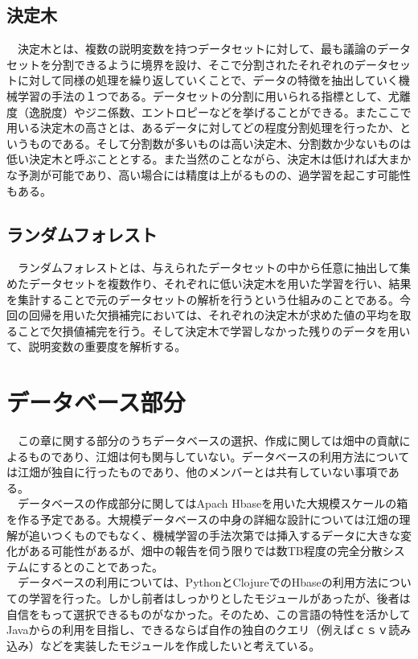 \documentclass{scrartcl}
\begin{document}
\begin{table}[htbp]
\subsection{決定木}
\label{sec:orgda66a07}
　決定木とは、複数の説明変数を持つデータセットに対して、最も議論のデータセットを分割できるように境界を設け、そこで分割されたそれぞれのデータセットに対して同様の処理を繰り返していくことで、データの特徴を抽出していく機械学習の手法の１つである。データセットの分割に用いられる指標として、尤離度（逸脱度）やジニ係数、エントロピーなどを挙げることができる。またここで用いる決定木の高さとは、あるデータに対してどの程度分割処理を行ったか、というものである。そして分割数が多いものは高い決定木、分割数か少ないものは低い決定木と呼ぶこととする。また当然のことながら、決定木は低ければ大まかな予測が可能であり、高い場合には精度は上がるものの、過学習を起こす可能性もある。\\
\subsection{ランダムフォレスト}
\label{sec:orgee1b924}
　ランダムフォレストとは、与えられたデータセットの中から任意に抽出して集めたデータセットを複数作り、それぞれに低い決定木を用いた学習を行い、結果を集計することで元のデータセットの解析を行うという仕組みのことである。今回の回帰を用いた欠損補完においては、それぞれの決定木が求めた値の平均を取ることで欠損値補完を行う。そして決定木で学習しなかった残りのデータを用いて、説明変数の重要度を解析する。\\

\section{データベース部分}
\label{sec:org23c54de}
　この章に関する部分のうちデータベースの選択、作成に関しては畑中の貢献によるものであり、江畑は何も関与していない。データベースの利用方法については江畑が独自に行ったものであり、他のメンバーとは共有していない事項である。\\
　データベースの作成部分に関してはApach Hbaseを用いた大規模スケールの箱を作る予定である。大規模データベースの中身の詳細な設計については江畑の理解が追いつくものでもなく、機械学習の手法次第では挿入するデータに大きな変化がある可能性があるが、畑中の報告を伺う限りでは数TB程度の完全分散システムにするとのことであった。\\
　データベースの利用については、PythonとClojureでのHbaseの利用方法についての学習を行った。しかし前者はしっかりとしたモジュールがあったが、後者は自信をもって選択できるものがなかった。そのため、この言語の特性を活かしてJavaからの利用を目指し、できるならば自作の独自のクエリ（例えばｃｓｖ読み込み）などを実装したモジュールを作成したいと考えている。\\


\end{table}
\end{document}
